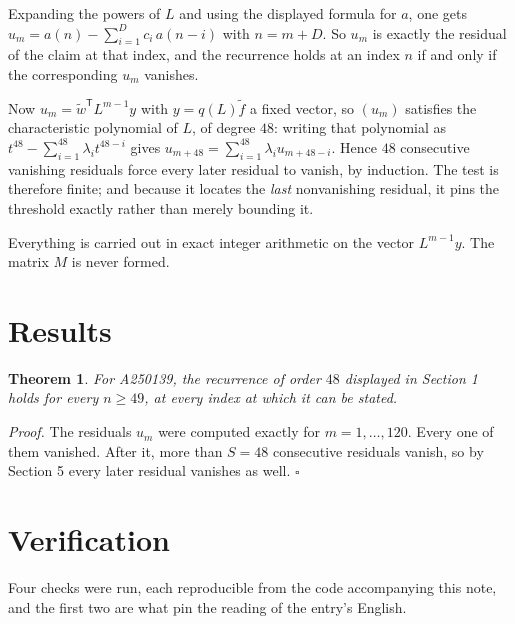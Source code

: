 \documentclass[11pt]{article}
\newtheorem{theorem}{Theorem}
\theoremstyle{definition}
\begin{document}
Expanding the powers of $L$ and using the displayed formula for $a$, one gets $u_m = a(n) - \sum_{i=1}^{D} c_i\,a(n-i)$ with $n = m + D$. So $u_m$ is exactly the residual of the claim at that index, and the recurrence holds at an index $n$ if and only if the corresponding $u_m$ vanishes.

Now $u_m = \tilde w^{\mathsf T} L^{m-1} y$ with $y = q(L)\tilde f$ a fixed vector, so $(u_m)$ satisfies the characteristic polynomial of $L$, of degree $48$: writing that polynomial as $t^{48} - \sum_{i=1}^{48} \lambda_i t^{48-i}$ gives $u_{m+48} = \sum_{i=1}^{48} \lambda_i u_{m+48-i}$. Hence $48$ consecutive vanishing residuals force every later residual to vanish, by induction. The test is therefore finite; and because it locates the {\itshape last} nonvanishing residual, it pins the threshold exactly rather than merely bounding it.

Everything is carried out in exact integer arithmetic on the vector $L^{m-1}y$. The matrix $M$ is never formed.

\section{Results}

\begin{theorem} For A250139, the recurrence of order $48$ displayed in Section 1 holds for every $n \ge 49$, at every index at which it can be stated.\end{theorem}

{\itshape Proof.} The residuals $u_m$ were computed exactly for $m = 1,\dots,120$. Every one of them vanished. After it, more than $S = 48$ consecutive residuals vanish, so by Section 5 every later residual vanishes as well. $\square$

\section{Verification}

Four checks were run, each reproducible from the code accompanying this note, and the first two are what pin the reading of the entry's English.
\end{document}
